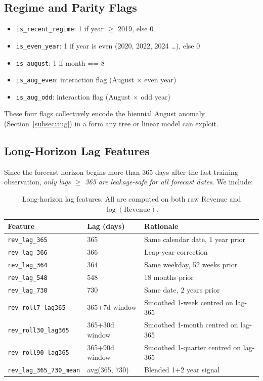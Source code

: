 \documentclass{article}
\begin{document}
\subsection{Regime and Parity Flags}

\begin{itemize}[leftmargin=1.5em, itemsep=2pt]
  \item \texttt{is\_recent\_regime}: 1 if year $\ge$ 2019, else 0
  \item \texttt{is\_even\_year}: 1 if year is even (2020, 2022, 2024 \ldots), else 0
  \item \texttt{is\_august}: 1 if month == 8
  \item \texttt{is\_aug\_even}: interaction flag (August $\times$ even year)
  \item \texttt{is\_aug\_odd}: interaction flag (August $\times$ odd year)
\end{itemize}

These four flags collectively encode the biennial August anomaly
(Section~\ref{subsec:aug}) in a form any tree or linear model can exploit.

\subsection{Long-Horizon Lag Features}
\label{subsec:lags}

Since the forecast horizon begins more than 365 days after the last training
observation, \emph{only lags $\ge$ 365 are leakage-safe for all forecast dates}.
We include:

\begin{table}[H]
\centering
\caption{Long-horizon lag features. All are computed on both raw Revenue and
$\log(\text{Revenue})$.}
\label{tab:lags}
\begin{tabular}{lll}
\toprule
\textbf{Feature} & \textbf{Lag (days)} & \textbf{Rationale}\\
\midrule
\texttt{rev\_lag\_365}     & 365 & Same calendar date, 1 year prior \\
\texttt{rev\_lag\_366}     & 366 & Leap-year correction \\
\texttt{rev\_lag\_364}     & 364 & Same weekday, 52 weeks prior \\
\texttt{rev\_lag\_548}     & 548 & 18 months prior \\
\texttt{rev\_lag\_730}     & 730 & Same date, 2 years prior \\
\texttt{rev\_roll7\_lag365} & 365+7d window & Smoothed 1-week centred on lag-365 \\
\texttt{rev\_roll30\_lag365}& 365+30d window & Smoothed 1-month centred on lag-365 \\
\texttt{rev\_roll90\_lag365}& 365+90d window & Smoothed 1-quarter centred on lag-365 \\
\texttt{rev\_lag\_365\_730\_mean} & avg(365, 730) & Blended 1+2 year signal \\
\bottomrule
\end{tabular}
\end{table}
\end{document}
